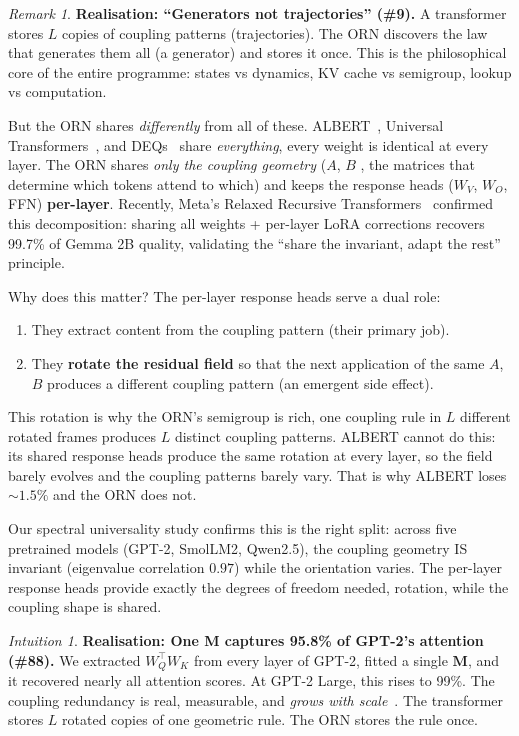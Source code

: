 \documentclass[11pt, a4paper]{article}
\newcommand{\M}{\mathbf{M}}
\theoremstyle{remark}
\newtheorem*{remark}{Remark}
\newtheorem*{intuition}{Intuition}
\begin{document}
\begin{remark}
\textbf{Realisation: ``Generators not trajectories'' (\#9).}
A transformer stores $L$ copies of coupling patterns (trajectories).
The ORN discovers the law that generates them all (a generator) and stores it once.
This is the philosophical core of the entire programme: states vs dynamics, KV cache vs semigroup, lookup vs computation.
\end{remark}

But the ORN shares \emph{differently} from all of these.
ALBERT~\cite{lan2020albert}, Universal Transformers~\cite{dehghani2018universal}, and DEQs~\cite{bai2019deep} share \emph{everything}, every weight is identical at every layer.
The ORN shares \emph{only the coupling geometry} ($A$, $B$ ,  the matrices that determine which tokens attend to which) and keeps the response heads ($W_V$, $W_O$, FFN) \textbf{per-layer}.
Recently, Meta's Relaxed Recursive Transformers~\cite{relaxedrecursive2025} confirmed this decomposition: sharing all weights + per-layer LoRA corrections recovers 99.7\% of Gemma 2B quality, validating the ``share the invariant, adapt the rest'' principle.

Why does this matter?
The per-layer response heads serve a dual role:
\begin{enumerate}[nosep]
    \item They extract content from the coupling pattern (their primary job).
    \item They \textbf{rotate the residual field} so that the next application of the same $A$, $B$ produces a different coupling pattern (an emergent side effect).
\end{enumerate}

This rotation is why the ORN's semigroup is rich, one coupling rule in $L$ different rotated frames produces $L$ distinct coupling patterns.
ALBERT cannot do this: its shared response heads produce the same rotation at every layer, so the field barely evolves and the coupling patterns barely vary.
That is why ALBERT loses ${\sim}1.5\%$ and the ORN does not.

Our spectral universality study confirms this is the right split: across five pretrained models (GPT-2, SmolLM2, Qwen2.5), the coupling geometry IS invariant (eigenvalue correlation $0.97$) while the orientation varies.
The per-layer response heads provide exactly the degrees of freedom needed, rotation, while the coupling shape is shared.

\begin{intuition}
\textbf{Realisation: One M captures 95.8\% of GPT-2's attention (\#88).}
We extracted $W_Q^\top W_K$ from every layer of GPT-2, fitted a single $\M$, and it recovered nearly all attention scores.
At GPT-2 Large, this rises to 99\%.
The coupling redundancy is real, measurable, and \emph{grows with scale}~\cite{masa2025}.
The transformer stores $L$ rotated copies of one geometric rule.
The ORN stores the rule once.
\end{intuition}
\end{document}
